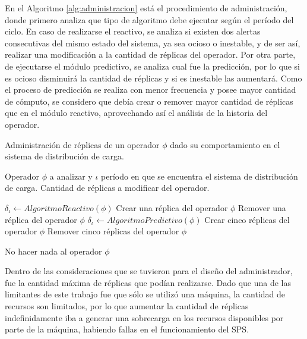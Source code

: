 En el Algoritmo \ref{alg:administracion} está el procedimiento de administración, donde primero analiza que tipo de algoritmo debe ejecutar según el período del ciclo. En caso de realizarse el reactivo, se analiza si existen dos alertas consecutivas del mismo estado del sistema, ya sea ocioso o inestable, y de ser así, realizar una modificación a la cantidad de réplicas del operador. Por otra parte, de ejecutarse el módulo predictivo, se analiza cual fue la predicción, por lo que si es ocioso disminuirá la cantidad de réplicas y si es inestable las aumentará. Como el proceso de predicción se realiza con menor frecuencia y posee mayor cantidad de cómputo, se considero que debía crear o remover mayor cantidad de réplicas que en el módulo reactivo, aprovechando así el análisis de la historia del operador.

\begin{algorithm}[!hb]
	\caption{Administración de réplicas de un operador $\phi$ dado su comportamiento en el sistema de distribución de carga.}
	\label{alg:administracion}
	\begin{algorithmic}[1]
	\REQUIRE Operador $\phi$ a analizar y $\iota$ período en que se encuentra el sistema de distribución de carga.
	\ENSURE Cantidad de réplicas a modificar del operador.	
	
		\STATE $\delta_{\iota} \leftarrow AlgoritmoReactivo(\phi)$
				\RETURN Crear una réplica del operador $\phi$
			\ENDIF
			\RETURN Remover una réplica del operador $\phi$
		\ENDIF 
	\ELSE
		\STATE $\delta_{\iota} \leftarrow AlgoritmoPredictivo(\phi)$
				\RETURN Crear cinco réplicas del operador $\phi$
			\ENDIF
			\RETURN Remover cinco réplicas del operador $\phi$
		\ENDIF
	\ENDIF
	
	\RETURN No hacer nada al operador $\phi$
	
	\end{algorithmic}
\end{algorithm}

Dentro de las consideraciones que se tuvieron para el diseño del administrador, fue la cantidad máxima de réplicas que podían realizarse. Dado que una de las limitantes de este trabajo fue que sólo se utilizó una máquina, la cantidad de recursos son limitados, por lo que aumentar la cantidad de réplicas indefinidamente iba a generar una sobrecarga en los recursos disponibles por parte de la máquina, habiendo fallas en el funcionamiento del SPS.